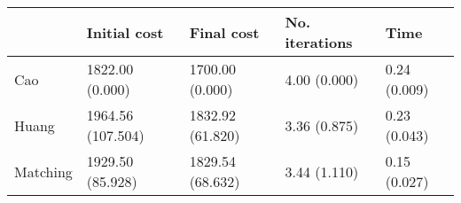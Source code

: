 \begin{tabular}{lllll}
\toprule
{} &       Initial cost &        Final cost & No. iterations &          Time \\
\midrule
Cao      &    1822.00 (0.000) &   1700.00 (0.000) &   4.00 (0.000) &  0.24 (0.009) \\
Huang    &  1964.56 (107.504) &  1832.92 (61.820) &   3.36 (0.875) &  0.23 (0.043) \\
Matching &   1929.50 (85.928) &  1829.54 (68.632) &   3.44 (1.110) &  0.15 (0.027) \\
\bottomrule
\end{tabular}
